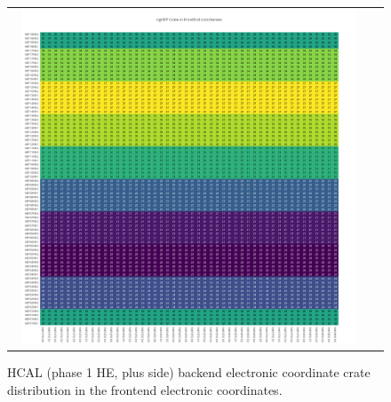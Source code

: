\clearpage
\begin{figure}[htb]
 \begin{center}
  \begin{tabular}{cc}
   \includegraphics[angle=0,width=0.95\textwidth]{figures/appendix/ngHEP_Crate_in_FrontEnd.png}
  \end{tabular}
  \caption{HCAL (phase 1 HE, plus side) backend electronic coordinate crate distribution in the frontend electronic coordinates.}
  \label{fig:lmapngHEPCrateFEC}
 \end{center}
\end{figure}

